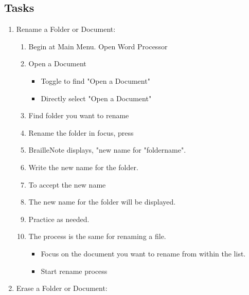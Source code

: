 \documentclass[10pt,letterpaper,twoside]{report}
\begin{document}
{\subsection{Tasks}
\begin{enumerate}
	\item Rename a Folder or Document:
	      \begin{enumerate}
		      \item Begin at Main Menu. Open Word Processor 
		      \item Open a Document
		            \begin{itemize}
			            \item Toggle to find "Open a Document"  
			            \item Directly select "Open a Document" 
		            \end{itemize}
		      \item Find folder you want to rename 
		      \item Rename the folder in focus, press  
		      \item BrailleNote displays, "new name for "foldername".
		      \item Write the new name for the folder.
		      \item To accept the new name 
		      \item The new name for the folder will be displayed.
		      \item Practice as needed.
		      \item The process is the same for renaming a file.
		            \begin{itemize}
			            \item Focus on the document you want to rename from within the list.
			            \item Start rename process 
		            \end{itemize}
	      \end{enumerate}
	\item Erase a Folder or Document:
	      \begin{enumerate}

\end{enumerate}
\end{enumerate}}
\end{document}
